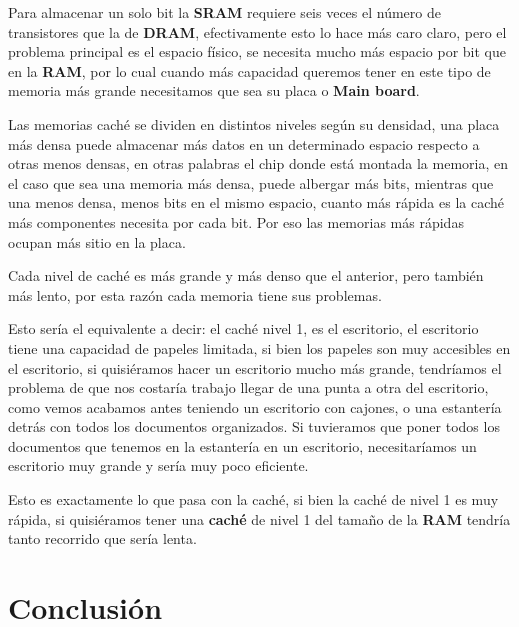 \documentclass{article}
\begin{document}
\vspace{0.5cm}

Para almacenar un solo bit la \textbf{SRAM} requiere seis veces el número de transistores que la de \textbf{DRAM}, efectivamente esto lo hace más caro claro, pero el problema principal es el espacio físico, se necesita mucho más espacio por bit que en la \textbf{RAM}, por lo cual cuando más capacidad queremos tener en este tipo de memoria más grande necesitamos que sea su placa o \textbf{Main board}.

\vspace{0.5cm}

Las memorias caché se dividen en distintos niveles según su densidad, una placa más densa puede almacenar más datos en un determinado espacio respecto a otras menos densas, en otras palabras
el chip donde está montada la memoria, en el caso que sea una memoria más densa, puede albergar más bits, mientras que una menos densa, menos bits en el mismo espacio, cuanto más rápida es la caché más componentes necesita por cada bit. Por eso las memorias más rápidas ocupan más sitio en la placa.

\vspace{0.5cm}

Cada nivel de caché es más grande y más denso que el anterior, pero también más lento, por esta razón cada memoria tiene sus problemas.

\vspace{0.5cm}

Esto sería el equivalente a decir: el caché nivel 1, es el escritorio, el escritorio tiene una capacidad de papeles limitada, si bien los papeles son muy accesibles en el escritorio, si quisiéramos hacer un escritorio mucho más grande, tendríamos el problema de que nos costaría trabajo llegar de una punta a otra del escritorio, como vemos acabamos antes teniendo un escritorio con cajones, o una estantería detrás con todos los documentos organizados. Si tuvieramos que poner todos los documentos que tenemos en la estantería en un escritorio, necesitaríamos un escritorio muy grande y sería muy poco eficiente. 

\vspace{0.5cm}

Esto es exactamente lo que pasa con la caché, si bien la caché de nivel 1 es muy rápida, si quisiéramos tener una \textbf{caché} de nivel 1 del tamaño de la \textbf{RAM} tendría tanto recorrido que sería lenta.

\section{Conclusión}
\end{document}
